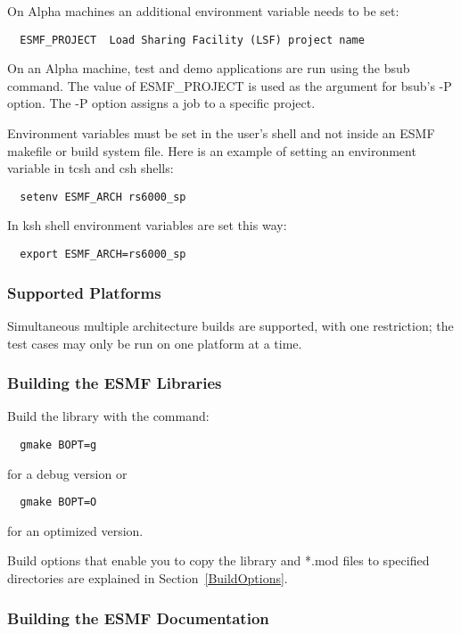 On Alpha machines an additional environment variable needs
to be set:

\begin{verbatim}
  ESMF_PROJECT  Load Sharing Facility (LSF) project name 
\end{verbatim}

On an Alpha machine, test and demo applications are run using 
the bsub command.  The value of ESMF\_PROJECT is used as the 
argument for bsub's -P option. The -P option assigns a job to 
a specific project.  

Environment variables must be set in the user's shell and not
inside an ESMF makefile or build system file.  Here is an example 
of setting an environment variable in tcsh and csh shells:
\begin{verbatim}
  setenv ESMF_ARCH rs6000_sp
\end{verbatim}
In ksh shell environment variables are set this way:
\begin{verbatim}
  export ESMF_ARCH=rs6000_sp
\end{verbatim}


\subsubsection{Supported Platforms}


Simultaneous multiple architecture builds are supported, with
one restriction; the test cases may only be run on one platform at a time. 

\subsubsection{Building the ESMF Libraries}
\label{BuildESMF}

Build the library with the command:
\begin{verbatim}
  gmake BOPT=g  
\end{verbatim}
  for a debug version or
\begin{verbatim}
  gmake BOPT=O  
\end{verbatim}
  for an optimized version.



Build options that enable you to copy the library and *.mod files to
specified directories are explained in Section~\ref{BuildOptions}. 

\subsubsection{Building the ESMF Documentation}
\label{BuildDocumentation}


